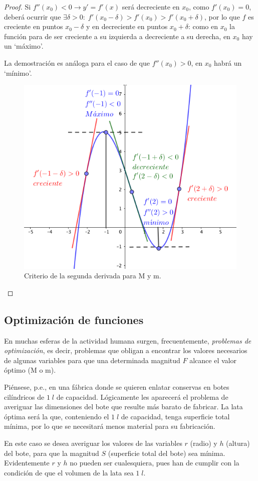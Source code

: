 	\begin{proof}
		Si $f''(x_0)<0 \to y'=f'(x)$ será decreciente en $x_0$, como $f'(x_0)=0$, deberá ocurrir que $\exists \delta>0: \; f'(x_0-\delta)>f'(x_0)>f'(x_0+\delta)$, por lo que $f$ es creciente en puntos $x_0-\delta$ y en decreciente en puntos $x_0+\delta$: como en $x_0$ la función para de ser creciente a su izquierda a decreciente a su derecha, en $x_0$ hay un `máximo'.
		
		La demostración es análoga para el caso de que $f''(x_0)>0$, en $x_0$ habrá un `mínimo'.
		
		\begin{figure}[H]
		\centering
		\includegraphics[width=.5\textwidth]{imagenes/imagenes05/T05IM10.png}
		\caption{Criterio de la segunda derivada para M y m.}
	\end{figure}
		 
	\end{proof}

	
	
	\subsection{Optimización de funciones}
	
	En muchas esferas de la actividad humana surgen, frecuentemente, \emph{problemas de optimización}, es decir, problemas que obligan a encontrar los valores necesarios de algunas variables para que una determinada magnitud $F$ alcance el valor óptimo (M o m).
	
	Piénsese, p.e., en una fábrica donde se quieren enlatar conservas en botes cilíndricos de $1 \; l$ de capacidad. Lógicamente les aparecerá el problema de averiguar las dimensiones del bote que resulte más barato de fabricar. La lata óptima será la que, conteniendo el $1 \; l$ de capacidad, tenga superficie total mínima, por lo que se necesitará menos material para su fabricación.
	
	En este caso se desea averiguar los valores de las variables $r$ (radio) y $h$ (altura) del bote, para que la magnitud $S$ (superficie total del bote) sea mínima. Evidentemente $r$ y $h$ no pueden ser cualesquiera, pues han de cumplir con la condición de que el volumen de la lata sea $1 \; l$.
	
